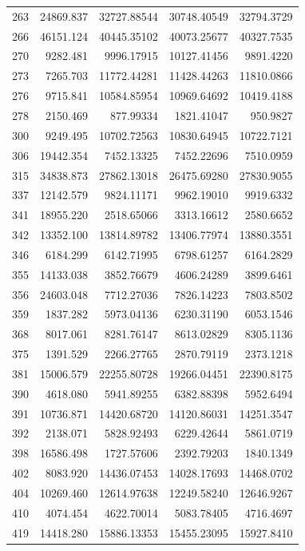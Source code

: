 \documentclass[
  12pt,
]{article}
\begin{document}
\begin{longtable}[]{@{}lrrrr@{}}
263 & 24869.837 & 32727.88544 & 30748.40549 & 32794.3729 \\
266 & 46151.124 & 40445.35102 & 40073.25677 & 40327.7535 \\
270 & 9282.481 & 9996.17915 & 10127.41456 & 9891.4220 \\
273 & 7265.703 & 11772.44281 & 11428.44263 & 11810.0866 \\
276 & 9715.841 & 10584.85954 & 10969.64692 & 10419.4188 \\
278 & 2150.469 & 877.99334 & 1821.41047 & 950.9827 \\
300 & 9249.495 & 10702.72563 & 10830.64945 & 10722.7121 \\
306 & 19442.354 & 7452.13325 & 7452.22696 & 7510.0959 \\
315 & 34838.873 & 27862.13018 & 26475.69280 & 27830.9055 \\
337 & 12142.579 & 9824.11171 & 9962.19010 & 9919.6332 \\
341 & 18955.220 & 2518.65066 & 3313.16612 & 2580.6652 \\
342 & 13352.100 & 13814.89782 & 13406.77974 & 13880.3551 \\
346 & 6184.299 & 6142.71995 & 6798.61257 & 6164.2829 \\
355 & 14133.038 & 3852.76679 & 4606.24289 & 3899.6461 \\
356 & 24603.048 & 7712.27036 & 7826.14223 & 7803.8502 \\
359 & 1837.282 & 5973.04136 & 6230.31190 & 6053.1546 \\
368 & 8017.061 & 8281.76147 & 8613.02829 & 8305.1136 \\
375 & 1391.529 & 2266.27765 & 2870.79119 & 2373.1218 \\
381 & 15006.579 & 22255.80728 & 19266.04451 & 22390.8175 \\
390 & 4618.080 & 5941.89255 & 6382.88398 & 5952.6494 \\
391 & 10736.871 & 14420.68720 & 14120.86031 & 14251.3547 \\
392 & 2138.071 & 5828.92493 & 6229.42644 & 5861.0719 \\
398 & 16586.498 & 1727.57606 & 2392.79203 & 1840.1349 \\
402 & 8083.920 & 14436.07453 & 14028.17693 & 14468.0702 \\
404 & 10269.460 & 12614.97638 & 12249.58240 & 12646.9267 \\
410 & 4074.454 & 4622.70014 & 5083.78405 & 4716.4697 \\
419 & 14418.280 & 15886.13353 & 15455.23095 & 15927.8410 \\

\end{longtable}
\end{document}
